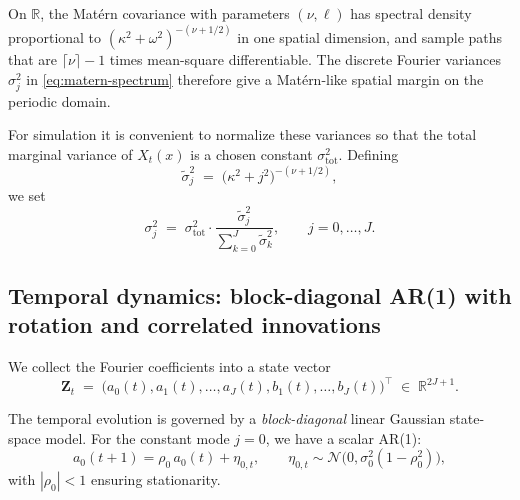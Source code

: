 \documentclass[answers,12pt,addpoints]{exam}
\begin{document}
On $\mathbb{R}$, the Matérn covariance with parameters $(\nu,\ell)$ has spectral density proportional to $(\kappa^2 + \omega^2)^{-(\nu + 1/2)}$ in one spatial dimension, and sample paths that are $\lceil \nu \rceil - 1$ times mean-square differentiable. The discrete Fourier variances $\sigma_j^2$ in \eqref{eq:matern-spectrum} therefore give a Matérn-like spatial margin on the periodic domain.

For simulation it is convenient to normalize these variances so that the total marginal variance of $X_t(x)$ is a chosen constant $\sigma^2_{\text{tot}}$. Defining
\[
  \tilde{\sigma}_j^2
  \;=\;
  \bigl(\kappa^2 + j^2\bigr)^{-(\nu + 1/2)},
\]
we set
\begin{equation}
  \sigma_j^2
  \;=\;
  \sigma^2_{\text{tot}}
  \cdot
  \frac{\tilde{\sigma}_j^2}{\sum_{k=0}^{J} \tilde{\sigma}_k^2},
  \qquad j = 0,\dots,J.
  \label{eq:sigma-normalization}
\end{equation}

\subsection{Temporal dynamics: block-diagonal AR(1) with rotation and correlated innovations}

We collect the Fourier coefficients into a state vector
\begin{equation}
  \mathbf{Z}_t
  \;=\;
  \bigl(a_0(t), a_1(t),\dots,a_J(t), b_1(t),\dots,b_J(t)\bigr)^\top
  \;\in\; \mathbb{R}^{2J+1}.
  \label{eq:state-vector}
\end{equation}

The temporal evolution is governed by a \emph{block-diagonal} linear Gaussian state-space model. For the constant mode $j=0$, we have a scalar AR(1):
\begin{equation}
  a_0(t+1) = \rho_0\, a_0(t) + \eta_{0,t},
  \qquad \eta_{0,t} \sim \mathcal{N}\bigl(0, \sigma_0^2(1 - \rho_0^2)\bigr),
  \label{eq:ar1-j0}
\end{equation}
with $|\rho_0| < 1$ ensuring stationarity.
\end{document}
